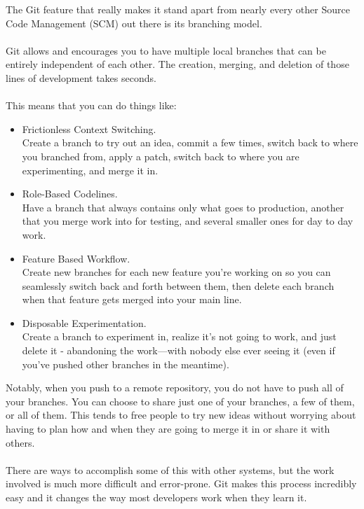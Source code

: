 The Git feature that really makes it stand apart from nearly every
other Source Code Management (SCM) out there is its branching model.\\
\\
Git allows and encourages you to have multiple local branches that can
be entirely independent of each other. The creation, merging, and
deletion of those lines of development takes seconds.\\ \\
This means that you can do things like:
\begin{itemize}
\item Frictionless Context Switching.\\ Create a branch to try out an
idea, commit a few times, switch back to where you branched from,
apply a patch, switch back to where you are experimenting, and merge
it in.
\item Role-Based Codelines. \\ Have a branch that always contains only
what goes to production, another that you merge work into for testing,
and several smaller ones for day to day work.
\item Feature Based Workflow. \\ Create new branches for each new
feature you're working on so you can seamlessly switch back and forth
between them, then delete each branch when that feature gets merged
into your main line.
\item Disposable Experimentation.\\  Create a branch to experiment in,
realize it's not going to work, and just delete it - abandoning the
work—with nobody else ever seeing it (even if you've pushed other
branches in the meantime).
\end{itemize}
Notably, when you push to a remote repository, you do not have to push
all of your branches. You can choose to share just one of your
branches, a few of them, or all of them. This tends to free people to
try new ideas without worrying about having to plan how and when they
are going to merge it in or share it with others.\\ \\
There are ways to accomplish some of this with other systems, but the
work involved is much more difficult and error-prone. Git makes this
process incredibly easy and it changes the way most developers work
when they learn it.

